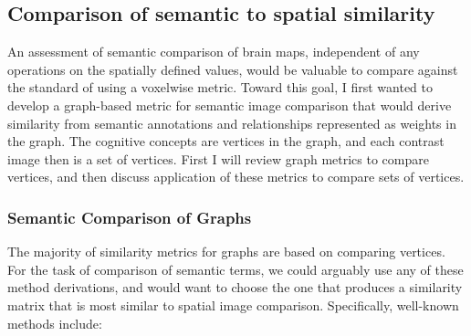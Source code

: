 \documentclass{report}
\begin{document}
\subsection{Comparison of semantic to spatial similarity}

An assessment of semantic comparison of brain maps, independent of any
operations on the spatially defined values, would be valuable to compare
against the standard of using a voxelwise metric. Toward this goal, I
first wanted to develop a graph-based metric for semantic image
comparison that would derive similarity from semantic annotations and
relationships represented as weights in the graph. The cognitive concepts are vertices in the graph, and each contrast image then is a set of vertices. First I will review graph metrics to compare vertices, and then discuss application of these metrics to compare sets of vertices.

\subsubsection{Semantic Comparison of Graphs}
The majority of similarity metrics for graphs are based on comparing vertices. For the task of comparison of semantic terms, we could arguably use any of these method derivations, and would want to choose the one that produces a similarity matrix that is most similar to spatial image comparison. Specifically, well-known methods include:
\end{document}
